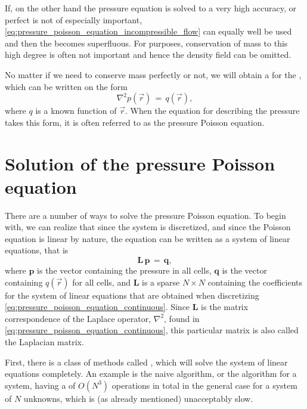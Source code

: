 If, on the other hand the pressure equation is solved to a very high accuracy, or perfect  is not of especially important, \eqref{eq:pressure_poisson_equation_incompressible_flow} can equally well be used and then the  becomes superfluous. For \simulation purposes, conservation of mass to this high degree is often not important and hence the density field can be omitted.

No matter if we need to conserve mass perfectly or not, we will obtain a  for the , which can be written on the form
%
\begin{equation} \label{eq:pressure_poisson_equation_continuous}
\nabla^2 p(\vec{r}) \,=\, q(\vec{r}),
\end{equation}
%
where $q$ is a known function of $\vec{r}$. When the equation for describing the pressure takes this form, it is often referred to as the pressure Poisson equation.

\section{Solution of the pressure Poisson equation}

\label{sec:pressure_poisson_equation_solution}

There are a number of ways to solve the pressure Poisson equation. To begin with, we can realize that since the system is discretized, and since the Poisson equation is linear by nature, the equation can be written as a system of linear equations, that is
%
\begin{equation} \label{eq:pressure_poisson_equation_matrix}
\mathbf{L\,p} \,=\, \mathbf{q},
\end{equation}
%
where $\mathbf{p}$ is the vector containing the pressure in all cells, $\mathbf{q}$ is the vector containing $q(\vec{r})$ for all cells, and $\mathbf{L}$ is a sparse $N\times N$  containing the coefficients for the system of linear equations that are obtained when discretizing \eqref{eq:pressure_poisson_equation_continuous}. Since $\mathbf{L}$ is the matrix correspondence of the Laplace operator, $\nabla^2$, found in \eqref{eq:pressure_poisson_equation_continuous}, this particular matrix is also called the Laplacian matrix.

First, there is a class of methods called , which will solve the system of linear equations completely. An example is the naive  algorithm, or the  algorithm for a  system, having a  of $O(N^3)$ operations in total in the general case for a system of $N$ unknowns, which is (as already mentioned) unacceptably slow.

